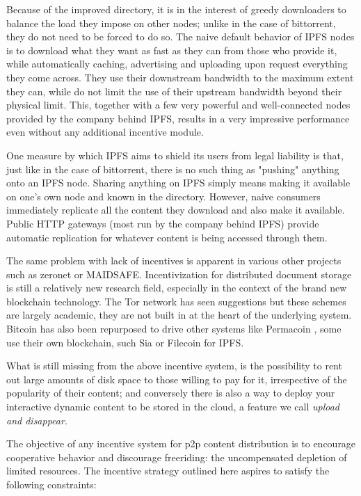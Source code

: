 Because of the improved directory, it is in the interest of greedy downloaders to balance the load they impose on other nodes; unlike in the case of bittorrent, they do not need to be forced to do so. The naive default behavior of IPFS nodes is to download what they want as fast as  they can from those who provide it, while automatically caching, advertising and uploading upon request everything they come across. They use their downstream bandwidth to the maximum extent they can, while do not limit the use of their upstream bandwidth beyond their physical limit. This, together with a few very powerful and well-connected nodes provided by the company behind IPFS, results in a very impressive performance even without any additional incentive module.


One measure by which IPFS aims to shield its users from legal liability is that, just like in the case of bittorrent, there is no such thing as "pushing" anything onto an IPFS node. Sharing anything on IPFS simply means making it available on one's own node and known in the directory. However, naive consumers immediately replicate all the content they download and also make it available. Public HTTP gateways (most run by the company behind IPFS) provide automatic replication for whatever content is being accessed through them.

The same problem with lack of incentives is apparent in various other projects such as zeronet or MAIDSAFE. Incentivization for distributed document storage is still a relatively new research field, especially in the context of the brand new blockchain technology. The Tor network has seen suggestions \cite{jansen2014onions,hoshetal2014tor} but these schemes are largely academic, they are not built in at the heart of the underlying system. Bitcoin has also been repurposed to drive other systems like Permacoin \cite{miller2014permacoin}, some use their own blockchain, such Sia \cite{vorick2014sia} or Filecoin \cite{filecoin2014} for IPFS.

What is still missing from the above incentive system, is the possibility to rent out large amounts of disk space to those willing to pay for it, irrespective of the popularity of their content; and conversely there is also a way to deploy your interactive dynamic content to be stored in the cloud, a feature we call \emph{upload and disappear}.

The objective of any incentive system for p2p content distribution is to encourage cooperative behavior and discourage freeriding: the uncompensated depletion of limited resources. The incentive strategy outlined here aspires to satisfy the following constraints:

